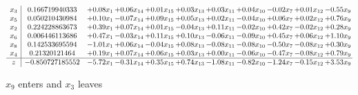 \documentclass[9pt]{article}
\begin{document}
 \[\begin{array}{c| c c@{\hskip 2pt} c@{\hskip 2pt} c@{\hskip 2pt} c@{\hskip 2pt} c@{\hskip 2pt} c@{\hskip 2pt} c@{\hskip 2pt} c@{\hskip 2pt} c@{\hskip 2pt} }
 x_{3}   &  0.166719940333 & +  0.08 x_{1} & +  0.06 x_{14} & +  0.01 x_{15} & +  0.03 x_{13} & +  0.03 x_{11} & +  0.04 x_{10} & -0.02 x_{7} & +  0.01 x_{12} & -0.55 x_{9}\\
 x_{5}   &  0.050210430984 & +  0.10 x_{1} & -0.07 x_{14} & +  0.09 x_{15} & +  0.05 x_{13} & +  0.02 x_{11} & -0.04 x_{10} & +  0.06 x_{7} & +  0.02 x_{12} & +  0.76 x_{9}\\
 x_{2}   &  0.224228863673 & +  0.39 x_{1} & +  0.07 x_{14} & +  0.01 x_{15} & -0.04 x_{13} & +  0.11 x_{11} & -0.02 x_{10} & +  0.42 x_{7} & -0.02 x_{12} & +  0.28 x_{9}\\
 x_{6}   &  0.006446113686 & +  0.47 x_{1} & -0.03 x_{14} & +  0.11 x_{15} & +  0.10 x_{13} & -0.06 x_{11} & -0.09 x_{10} & +  0.45 x_{7} & +  0.06 x_{12} & +  1.10 x_{9}\\
 x_{8}   &  0.142533695594 & -1.01 x_{1} & +  0.06 x_{14} & -0.04 x_{15} & +  0.08 x_{13} & -0.08 x_{11} & -0.08 x_{10} & -0.50 x_{7} & -0.08 x_{12} & +  0.30 x_{9}\\
 x_{4}   &  0.21320121464 & +  0.19 x_{1} & +  0.07 x_{14} & +  0.06 x_{15} & +  0.03 x_{13} & +  0.00 x_{11} & -0.06 x_{10} & -0.47 x_{7} & -0.08 x_{12} & +  0.79 x_{9}\\
\hline
z    &  -0.850727185552 & -5.72 x_{1} & -0.31 x_{14} & +  0.35 x_{15} & +  0.74 x_{13} & -1.08 x_{11} & -0.82 x_{10} & -1.24 x_{7} & -0.15 x_{12} & +  3.53 x_{9}\\
\end{array}\]


 $ x_{9} $ enters and $ x_{3} $ leaves 
\end{document}
